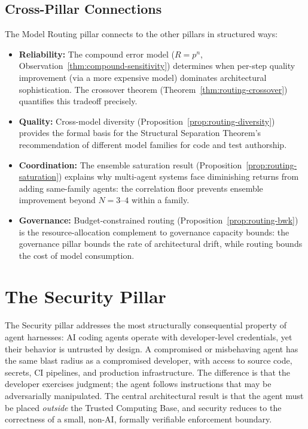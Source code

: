\documentclass[11pt, a4paper]{googledeepmind}
\begin{document}
\subsection{Cross-Pillar Connections}

The Model Routing pillar connects to the other pillars in structured ways:

\begin{itemize}[nosep]
\item \textbf{Reliability:} The compound error model ($R = p^n$, Observation~\ref{thm:compound-sensitivity}) determines when per-step quality improvement (via a more expensive model) dominates architectural sophistication. The crossover theorem (Theorem~\ref{thm:routing-crossover}) quantifies this tradeoff precisely.
\item \textbf{Quality:} Cross-model diversity (Proposition~\ref{prop:routing-diversity}) provides the formal basis for the Structural Separation Theorem's recommendation of different model families for code and test authorship.
\item \textbf{Coordination:} The ensemble saturation result (Proposition~\ref{prop:routing-saturation}) explains why multi-agent systems face diminishing returns from adding same-family agents: the correlation floor prevents ensemble improvement beyond $N = 3$--$4$ within a family.
\item \textbf{Governance:} Budget-constrained routing (Proposition~\ref{prop:routing-bwk}) is the resource-allocation complement to governance capacity bounds: the governance pillar bounds the rate of architectural drift, while routing bounds the cost of model consumption.
\end{itemize}



\section{The Security Pillar}
\label{sec:security}

The Security pillar addresses the most structurally consequential property of agent harnesses: AI coding agents operate with developer-level credentials, yet their behavior is untrusted by design. A compromised or misbehaving agent has the same blast radius as a compromised developer, with access to source code, secrets, CI pipelines, and production infrastructure. The difference is that the developer exercises judgment; the agent follows instructions that may be adversarially manipulated. The central architectural result is that the agent must be placed \emph{outside} the Trusted Computing Base, and security reduces to the correctness of a small, non-AI, formally verifiable enforcement boundary.
\end{document}
